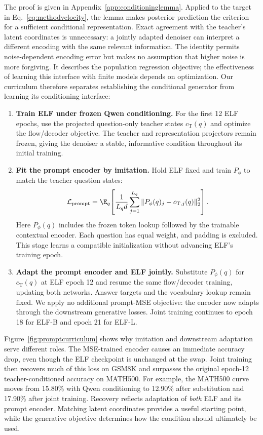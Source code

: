 The proof is given in Appendix~\ref{app:conditioninglemma}. Applied to the target in Eq.~\eqref{eq:methodvelocity}, the lemma makes posterior prediction the criterion for a sufficient conditional representation. Exact agreement with the teacher's latent coordinates is unnecessary: a jointly adapted denoiser can interpret a different encoding with the same relevant information. The identity permits noise-dependent encoding error but makes no assumption that higher noise is more forgiving. It describes the population regression objective; the effectiveness of learning this interface with finite models depends on optimization. Our curriculum therefore separates establishing the conditional generator from learning its conditioning interface:
\begin{enumerate}
 \item \textbf{Train ELF under frozen Qwen conditioning.}
 For the first 12 ELF epochs, use the projected question-only teacher states $c_{\mathrm T}(q)$ and optimize the flow/decoder objective. The teacher and representation projectors remain frozen, giving the denoiser a stable, informative condition throughout its initial training.

 \item \textbf{Fit the prompt encoder by imitation.}
 Hold ELF fixed and train $P_\phi$ to match the teacher question states:
 \begin{equation}
  \mathcal L_{\mathrm{prompt}}=
  \E_q\!\left[\frac{1}{L_qd}\sum_{j=1}^{L_q}
  \|P_\phi(q)_j-c_{\mathrm T,j}(q)\|_2^2\right].
  \label{eq:methodpromptmse}
 \end{equation}
 Here $P_\phi(q)$ includes the frozen token lookup followed by the trainable contextual encoder. Each question has equal weight, and padding is excluded. This stage learns a compatible initialization without advancing ELF's training epoch.

 \item \textbf{Adapt the prompt encoder and ELF jointly.}
 Substitute $P_\phi(q)$ for $c_{\mathrm T}(q)$ at ELF epoch 12 and resume the same flow/decoder training, updating both networks. Answer targets and the vocabulary lookup remain fixed. We apply no additional prompt-MSE objective: the encoder now adapts through the downstream generative losses. Joint training continues to epoch 18 for ELF-B and epoch 21 for ELF-L.
\end{enumerate}



Figure~\ref{fig:promptcurriculum} shows why imitation and downstream adaptation serve different roles. The MSE-trained encoder causes an immediate accuracy drop, even though the ELF checkpoint is unchanged at the swap. Joint training then recovers much of this loss on GSM8K and surpasses the original epoch-12 teacher-conditioned accuracy on MATH500. For example, the MATH500 curve moves from 15.80\% with Qwen conditioning to 12.90\% after substitution and 17.90\% after joint training. Recovery reflects adaptation of \emph{both} ELF and its prompt encoder. Matching latent coordinates provides a useful starting point, while the generative objective determines how the condition should ultimately be used.

